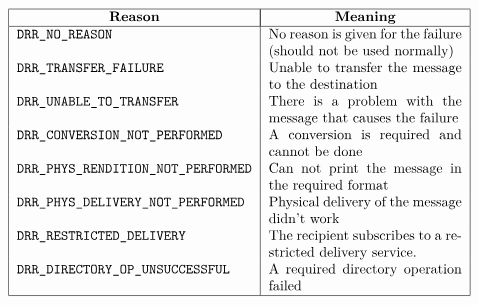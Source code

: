\[\begin{tabular}{|l|p{0.4\textwidth}|}
\hline
	\multicolumn{1}{|c|}{\bf Reason}&
		\multicolumn{1}{|c|}{\bf Meaning}\\
\hline
	\tt DRR\_NO\_REASON&	
		No reason is given for the failure (should not be used
		normally)\\
	\tt DRR\_TRANSFER\_FAILURE&	
		Unable to transfer the message to the destination \\
	\tt DRR\_UNABLE\_TO\_TRANSFER& 
		There is a problem with the message that causes the failure\\
	\tt DRR\_CONVERSION\_NOT\_PERFORMED&
		 A conversion is required and cannot be done\\
	\tt DRR\_PHYS\_RENDITION\_NOT\_PERFORMED&
		Can not print the message in the required format\\
	\tt DRR\_PHYS\_DELIVERY\_NOT\_PERFORMED&
		Physical delivery of the message didn't work\\
	\tt DRR\_RESTRICTED\_DELIVERY&
		The recipient subscribes to a restricted delivery service.\\
	\tt DRR\_DIRECTORY\_OP\_UNSUCCESSFUL&
		A required directory operation failed\\
\hline
\end{tabular}\]
